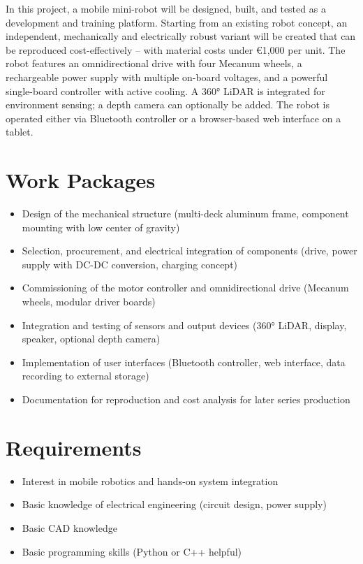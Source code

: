 \documentclass{ohm_project_description}
\begin{document}
\maketitle
\thispagestyle{fancy}

In this project, a mobile mini-robot will be designed, built, and tested as a
development and training platform. Starting from an existing robot concept, an
independent, mechanically and electrically robust variant will be created that can be
reproduced cost-effectively – with material costs under €1,000 per unit. The robot
features an omnidirectional drive with four Mecanum wheels, a rechargeable power
supply with multiple on-board voltages, and a powerful single-board controller with
active cooling. A 360° LiDAR is integrated for environment sensing; a depth camera
can optionally be added. The robot is operated either via Bluetooth controller or a
browser-based web interface on a tablet.

\section*{Work Packages}
\begin{itemize}[leftmargin=0.5cm]
    \setlength\itemsep{.1em}
    \item Design of the mechanical structure (multi-deck aluminum frame, component
          mounting with low center of gravity)
    \item Selection, procurement, and electrical integration of components (drive,
          power supply with DC-DC conversion, charging concept)
    \item Commissioning of the motor controller and omnidirectional drive (Mecanum
          wheels, modular driver boards)
    \item Integration and testing of sensors and output devices (360° LiDAR, display,
          speaker, optional depth camera)
    \item Implementation of user interfaces (Bluetooth controller, web interface, data
          recording to external storage)
    \item Documentation for reproduction and cost analysis for later series production
\end{itemize}

\section*{Requirements}
\begin{itemize}[leftmargin=0.5cm]
    \setlength\itemsep{.1em}
    \item Interest in mobile robotics and hands-on system integration
    \item Basic knowledge of electrical engineering (circuit design, power supply)
    \item Basic CAD knowledge
    \item Basic programming skills (Python or C++ helpful)
\end{itemize}
\end{document}

